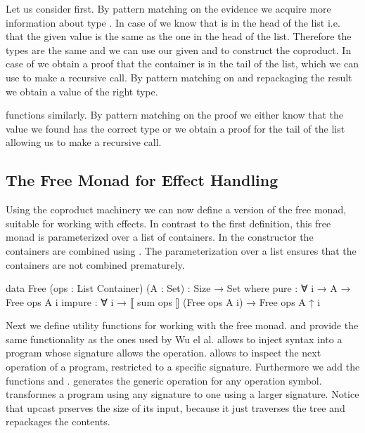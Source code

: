 Let us consider  first.
By pattern matching on the evidence we acquire more information about type 
\AgdaSpace{}.
In case of  we know that  is in
the head of the list i.e. that the given value 
is the same as the one in the head of the list.
Therefore the  types are the same and we can use our given
 and  to construct the coproduct.
In case of  we obtain a proof that the container
is in the tail of the list, which we can use to make a recursive call.
By pattern matching on and repackaging the result we obtain a value of the right
type.

 functions similarly.
By pattern matching on the proof we either know that the value we found has
the correct type or we obtain a proof for the tail of the list allowing us to
make a recursive call.

\subsection{The Free Monad for Effect Handling}

Using the coproduct machinery we can now define a version of the free monad,
suitable for working with effects.
In contrast to the first definition, this free monad is parameterized over a
list of containers.
In the  constructor the containers are combined
using .
The parameterization over a list ensures that the containers are not combined
prematurely.

\begin{code}
data Free (ops : List Container) (A : Set) : {Size} → Set where
  pure : ∀ {i} → A → Free ops A {i}
  impure : ∀ {i} → ⟦ sum ops ⟧ (Free ops A {i}) → Free ops A {↑ i}
\end{code}
Next we define utility functions for working with the free monad.
 and  provide the same functionality as the
ones used by Wu el al.
 allows to inject syntax into a program whose signature allows
the operation.
 allows to inspect the next operation of a
program, restricted to a specific signature.
Furthermore we add the functions  and .
 generates the generic operation for any operation symbol.
 transformes a program using any signature to one using a
larger signature.
Notice that upcast prserves the size of its input, because it just traverses the
tree and repackages the contents.

